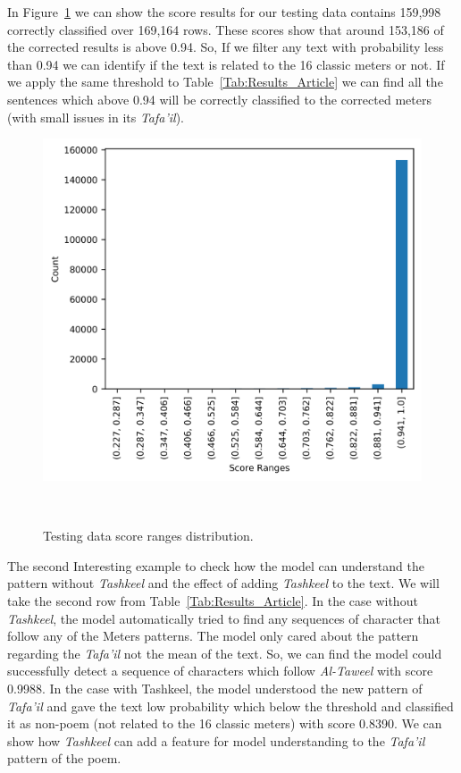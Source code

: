 
In Figure~\ref{Fig:Results_Distribution} we can show the score results for our testing data contains 159,998 correctly classified over 169,164 rows. These scores show that around 153,186 of the corrected results is above 0.94. So, If we filter any text with probability less than 0.94 we can identify if the text is related to the 16 classic meters or not. If we apply the same threshold to Table~\ref{Tab:Results_Article} we can find all the sentences which above 0.94 will be correctly classified to the corrected meters (with small issues in its \textit{Tafa’il}).

\begin{figure}[!t]
  \includegraphics{./Figures/Ch_7_Results/IMG_Result_Distribution.png}
  \caption{Testing data score ranges distribution.}~\label{Fig:Results_Distribution}
\end{figure}

The second Interesting example to check how the model can understand the pattern without  \textit{Tashkeel} and the effect of adding  \textit{Tashkeel} to the text. We will take the second row from Table~\ref{Tab:Results_Article}. In the case without  \textit{Tashkeel}, the model automatically tried to find any sequences of character that follow any of the Meters patterns. The model only cared about the pattern regarding the  \textit{Tafa'il} not the mean of the text. So, we can find the model could successfully detect a sequence of characters which follow \textit{Al-Taweel} with score 0.9988. In the case with Tashkeel, the model understood the new pattern of \textit{Tafa'il} and gave the text low probability which below the threshold and classified it as non-poem (not related to the 16 classic meters) with score 0.8390. We can show how  \textit{Tashkeel} can add a feature for model understanding to the \textit{Tafa'il} pattern of the poem.


